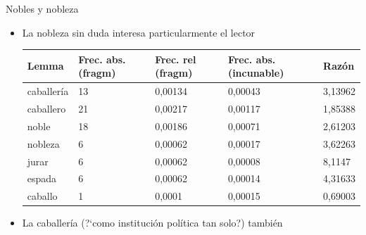\documentclass[11pt,aspectratio=169]{beamer}
\begin{document}
\begin{frame}{Nobles y nobleza}
\begin{center}
\begin{itemize}
\item La nobleza sin duda interesa particularmente el lector
\begin{table}[!ht]
    \centering
    \begin{tabular}{|l|l|l|l|l|}
    \hline
        \textbf{Lemma} & \textbf{Frec. abs. (fragm)} & \textbf{Frec. rel (fragm)} & \textbf{Frec. abs. (incunable)} & \textbf{Razón} \\ \hline
        caballería & 13 & 0,00134 & 0,00043 & 3,13962 \\ \hline
        caballero & 21 & 0,00217 & 0,00117 & 1,85388 \\ \hline        
	noble & 18 & 0,00186 & 0,00071 & 2,61203 \\ \hline
	nobleza & 6 & 0,00062 & 0,00017 & 3,62263 \\ \hline
        jurar & 6 & 0,00062 & 0,00008 & 8,1147 \\ \hline
        espada & 6 & 0,00062 & 0,00014 & 4,31633 \\ \hhline{|=|=|=|=|=|} 
        caballo & 1 & 0,0001 & 0,00015 & 0,69003 \\ \hline
    \end{tabular}
\end{table}
\item La caballería (?`como institución política tan solo?) también
\end{itemize}
\end{center}
\end{frame}
\end{document}
